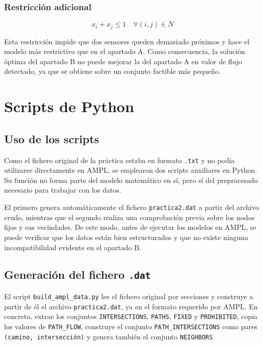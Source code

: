 \documentclass[12pt,a4paper]{article}
\begin{document}
\subsubsection{Restricción adicional}

\[
x_i + x_j \leq 1 \quad \forall (i,j) \in N
\]

Esta restricción impide que dos sensores queden demasiado próximos y hace el modelo más restrictivo que en el apartado A. Como consecuencia, la solución óptima del apartado B no puede mejorar la del apartado A en valor de flujo detectado, ya que se obtiene sobre un conjunto factible más pequeño.

\section{Scripts de Python}

\subsection{Uso de los scripts}

Como el fichero original de la práctica estaba en formato \texttt{.txt} y no podía utilizarse directamente en AMPL, se emplearon dos scripts auxiliares en Python. Su función no forma parte del modelo matemático en sí, pero sí del preprocesado necesario para trabajar con los datos.

El primero genera automáticamente el fichero \texttt{practica2.dat} a partir del archivo crudo, mientras que el segundo realiza una comprobación previa sobre los nodos fijos y sus vecindades. De este modo, antes de ejecutar los modelos en AMPL, se puede verificar que los datos están bien estructurados y que no existe ninguna incompatibilidad evidente en el apartado B.

\subsection{Generación del fichero \texttt{.dat}}

El script \texttt{build\_ampl\_data.py} lee el fichero original por secciones y construye a partir de él el archivo \texttt{practica2.dat}, ya en el formato requerido por AMPL. En concreto, extrae los conjuntos \texttt{INTERSECTIONS}, \texttt{PATHS}, \texttt{FIXED} y \texttt{PROHIBITED}, copia los valores de \texttt{PATH\_FLOW}, construye el conjunto \texttt{PATH\_INTERSECTIONS} como pares \texttt{(camino, intersección)} y genera también el conjunto \texttt{NEIGHBORS}.
\end{document}
